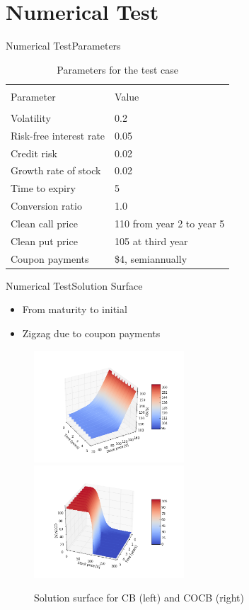 \documentclass{beamer}
\begin{document}
\section{Numerical Test}

\begin{frame}{Numerical Test}{Parameters}

	\begin{table}
		\centering
		\begin{tabular}{ll}
		\hline\hline\\
		Parameter &  Value \\
		\hline\\
		Volatility & 0.2 \\
		Risk-free interest rate & 0.05\\
		Credit risk & 0.02\\
		Growth rate of stock & 0.02\\
		Time to expiry & 5 \\
		Conversion ratio & 1.0 \\
		Clean call price & 110 from year 2 to year 5\\
		Clean put price & 105 at third year\\
		Coupon payments & \$4, semiannually\\
		\hline
		\end{tabular}
		\caption{Parameters for the test case}
		\label{tb:params}
	\end{table}
	
\end{frame}

\begin{frame}{Numerical Test}{Solution Surface}
	\begin{itemize}
		\item From maturity to initial
		\item Zigzag due to coupon payments
	\end{itemize}
	\begin{figure}
		\includegraphics[width=0.5\textwidth]{Figures/CBsurf}
		\includegraphics[width=0.5\textwidth]{Figures/COCBsurf}
		\caption{Solution surface for CB (left) and COCB (right)}
		\label{fig:surf}
	\end{figure}
\end{frame}
\end{document}
